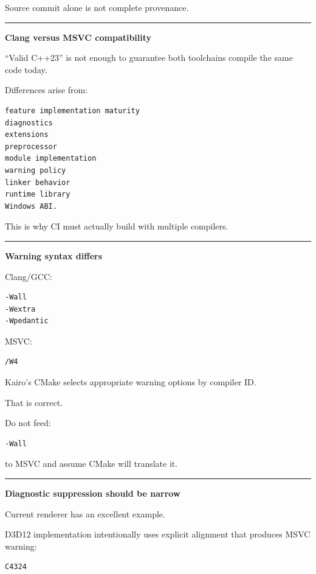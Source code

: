 Source commit alone is not complete provenance.

\begin{center}\rule{0.5\linewidth}{0.5pt}\end{center}

\textbf{Clang versus MSVC compatibility}

``Valid C++23'' is not enough to guarantee both toolchains compile the same code today.

Differences arise from:

\begin{verbatim}
feature implementation maturity
diagnostics
extensions
preprocessor
module implementation
warning policy
linker behavior
runtime library
Windows ABI.
\end{verbatim}

This is why CI must actually build with multiple compilers.

\begin{center}\rule{0.5\linewidth}{0.5pt}\end{center}

\textbf{Warning syntax differs}

Clang/GCC:

\begin{verbatim}
-Wall
-Wextra
-Wpedantic
\end{verbatim}

MSVC:

\begin{verbatim}
/W4
\end{verbatim}

Kairo's CMake selects appropriate warning options by compiler ID.

That is correct.

Do not feed:

\begin{verbatim}
-Wall
\end{verbatim}

to MSVC and assume CMake will translate it.

\begin{center}\rule{0.5\linewidth}{0.5pt}\end{center}

\textbf{Diagnostic suppression should be narrow}

Current renderer has an excellent example.

D3D12 implementation intentionally uses explicit alignment that produces MSVC warning:

\begin{verbatim}
C4324
\end{verbatim}

